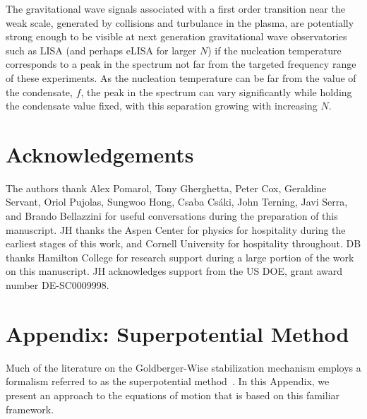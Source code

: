 \documentclass[12pt]{article}
\begin{document}
The gravitational wave signals associated with a first order transition near the weak scale, generated by collisions and turbulance in the plasma, are potentially strong enough to be visible at next generation gravitational wave observatories such as LISA (and perhaps eLISA for larger $N$) if the nucleation temperature corresponds to a peak in the spectrum not far from the targeted frequency range of these experiments.  As the nucleation temperature can be far from the value of the condensate, $f$, the peak in the spectrum can vary significantly while holding the condensate value fixed, with this separation growing with increasing $N$.


\section*{Acknowledgements}
The authors thank Alex Pomarol, Tony Gherghetta, Peter Cox, Geraldine Servant, Oriol Pujolas, Sungwoo Hong, Csaba Cs\'aki, John Terning, Javi Serra, and Brando Bellazzini for useful conversations during the preparation of this manuscript.  JH thanks the Aspen Center for physics for hospitality during the earliest stages of this work, and Cornell University for hospitality throughout.  DB thanks Hamilton College for research support during a large portion of the work on this manuscript.  JH acknowledges support from the US DOE, grant award number DE-SC0009998.  
\setcounter{equation}{0}
\setcounter{footnote}{0}
\appendix

\section{Appendix:  Superpotential Method} 
\setcounter{equation}{0}
\label{app:SuperPot}

Much of the literature on the Goldberger-Wise stabilization mechanism employs a formalism referred to as the superpotential method~\cite{DeWolfe:1999cp,Csaki:2000zn}.  In this Appendix, we present an approach to the equations of motion that is based on this familiar framework.  
\end{document}
